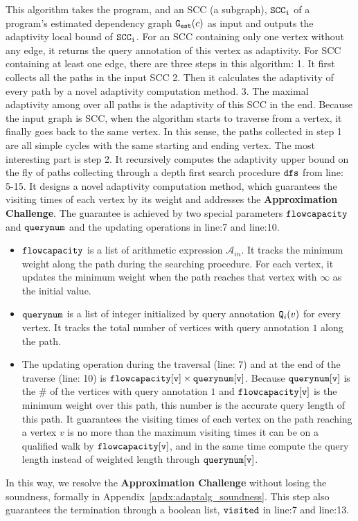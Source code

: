   This algorithm takes the program, and an SCC (a subgraph), 
  $\mathtt{SCC_i}$ of a program's estimated dependency graph $\mathtt{{G_{est}}}(c)$ as input
and outputs the adaptivity local bound of $\mathtt{SCC_i}$. 
For an SCC containing only one vertex without any edge, it returns the query annotation of this vertex as adaptivity.
For SCC containing at least one edge, 
there are three steps in this algorithm: 1. It first collects all the paths in the input SCC 2. Then it calculates the adaptivity of every path by a novel adaptivity computation method. 3. The maximal adaptivity among over all paths is the adaptivity of this SCC in the end. Because the input graph is SCC, when the algorithm starts to traverse from a vertex, it finally goes back to the same vertex.
In this sense, the paths collected in step 1 are all simple cycles with the same starting and ending vertex. 
The most interesting part is step 2. It recursively computes the adaptivity upper bound on the fly of paths collecting through a depth first search procedure $\mathtt{dfs}$ from line: 5-15.
It designs a novel adaptivity computation method, which guarantees the visiting times of each vertex by its weight and addresses the \textbf{Approximation Challenge}.
The guarantee is achieved by two special parameters $\mathtt{flowcapacity}$ and $\mathtt{querynum}$ and the updating operations in line:7 and line:10.
% 
\begin{itemize}
\item $\mathtt{flowcapacity}$ is a list of arithmetic expression $\mathcal{A}_{in}$.
It tracks the minimum weight
along the path during the 
searching procedure. For each vertex, it updates the minimum weight when the path reaches that vertex with $\infty$ as the initial value.
\item $\mathtt{querynum}$ is a list of integer
initialized by query annotation $\mathtt{Q}_i(v)$ for every vertex. 
It tracks the total number of vertices with query annotation $1$
along the path.
\item
The updating operation
during the traversal 
(line: 7) and 
at the end of the traverse (line: 10) is
$\mathtt{flowcapacity[v] \times querynum[v]}$.
Because $\mathtt{querynum[v]}$ is the \# of the vertices with query annotation $1$ and $\mathtt{flowcapacity[v]}$ is the minimum weight over this path,
this number is the accurate query length of this path. 
It guarantees 
the visiting times of each vertex on the path reaching a vertex $v$ is no more than 
the maximum visiting times it can be on a qualified walk by $\mathtt{flowcapacity[v]}$,
and 
in the same time  compute the query length instead of weighted length through 
$\mathtt{ querynum[v]}$.
\end{itemize}
In this way, we resolve the \textbf{Approximation Challenge} without losing the soundness, formally in Appendix~\ref{apdx:adaptalg_soundness}.
This step also guarantees the termination through a boolean list, $\mathtt{visited}$ in line:7 and line:13.
  

